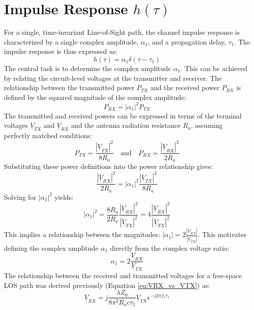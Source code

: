 \section{Impulse Response $h(\tau)$}
For a single, time-invariant Line-of-Sight path, the channel impulse response is characterized by a single complex amplitude, $\alpha_1$, and a propagation delay, $\tau_1$. The impulse response is thus expressed as:
\begin{equation}
	h(\tau) = \alpha_1 \delta(\tau - \tau_1)
\end{equation}
The central task is to determine the complex amplitude $\alpha_1$. This can be achieved by relating the circuit-level voltages at the transmitter and receiver. The relationship between the transmitted power $P_{TX}$ and the received power $P_{RX}$ is defined by the squared magnitude of the complex amplitude:
\begin{equation}
	P_{RX} = |\alpha_1|^2 P_{TX}
\end{equation}
The transmitted and received powers can be expressed in terms of the terminal voltages $\underline{V}_{TX}$ and $\underline{V}_{RX}$ and the antenna radiation resistance $R_a$, assuming perfectly matched conditions:
\begin{equation}
	P_{TX} = \frac{|\underline{V}_{TX}|^2}{8R_a} \quad \text{and} \quad P_{RX} = \frac{|\underline{V}_{RX}|^2}{2R_a}
\end{equation}
Substituting these power definitions into the power relationship gives:
\begin{equation}
	\frac{|\underline{V}_{RX}|^2}{2R_a} = |\alpha_1|^2 \frac{|\underline{V}_{TX}|^2}{8R_a}
\end{equation}
Solving for $|\alpha_1|^2$ yields:
\begin{equation}
	|\alpha_1|^2 = \frac{8R_a}{2R_a} \frac{|\underline{V}_{RX}|^2}{|\underline{V}_{TX}|^2} = 4 \frac{|\underline{V}_{RX}|^2}{|\underline{V}_{TX}|^2}
\end{equation}
This implies a relationship between the magnitudes: $|\alpha_1| = 2 \frac{|\underline{V}_{RX}|}{|\underline{V}_{TX}|}$. This motivates defining the complex amplitude $\alpha_1$ directly from the complex voltage ratio:
\begin{equation}
	\alpha_1 = 2 \frac{\underline{V}_{RX}}{\underline{V}_{TX}}
	\label{eq:alpha_from_voltages}
\end{equation}
The relationship between the received and transmitted voltages for a free-space LOS path was derived previously (Equation \ref{eq:VRX_vs_VTX}) as:
\begin{equation}
	\underline{V}_{RX} = j \frac{\lambda Z_0}{8\pi^2 R_a c\tau_1} \underline{V}_{TX} e^{-j2\pi f_c \tau_1}
\end{equation}
